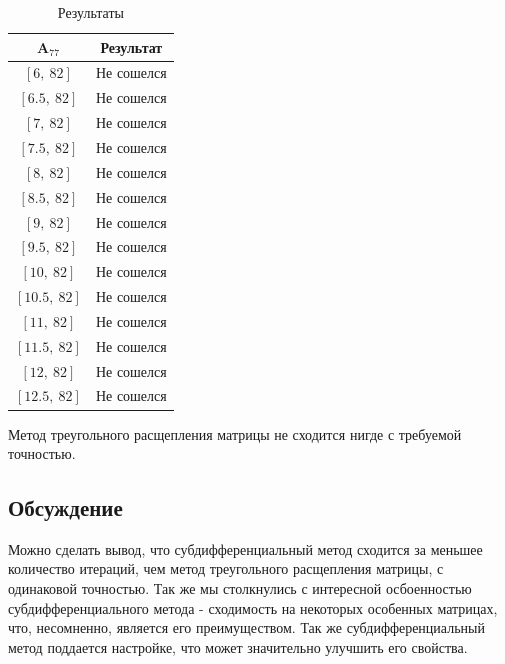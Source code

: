 \documentclass{article}
\begin{document}
    \begin{table}[H]
			\centering
			\begin{tabular}{|c|c|}
				\hline
				$\textbf{A}_{77}$ & Результат\\
				
				\hline
				$[6, \ 82]$ & Не сошелся \\
				
				\hline
				$[6.5, \ 82]$ & Не сошелся \\
				
				\hline
				$[7, \ 82]$ & Не сошелся \\
				
				\hline
				$[7.5, \ 82]$ & Не сошелся \\
				
				\hline
				$[8, \ 82]$ & Не сошелся \\
				
				\hline
				$[8.5, \ 82]$ & Не сошелся \\
				
				\hline
				$[9, \ 82]$ & Не сошелся \\
				
				\hline
				$[9.5, \ 82]$ & Не сошелся \\
				
				\hline
				$[10, \ 82]$ & Не сошелся \\
				
				\hline
				$[10.5, \ 82]$ & Не сошелся \\
				
				\hline
				$[11, \ 82]$ & Не сошелся \\
				
				\hline
				$[11.5, \ 82]$ & Не сошелся \\
				
				\hline
				$[12, \ 82]$ & Не сошелся \\
				
				\hline
				$[12.5, \ 82]$ & Не сошелся \\

				\hline
				
			\end{tabular}
			\caption{Результаты}
		\end{table}
	    
	    Метод треугольного расщепления матрицы не сходится нигде с требуемой точностью.
	    
    \subsection{Обсуждение}
    Можно сделать вывод, что субдифференциальный метод сходится за меньшее количество итераций, чем метод треугольного расщепления матрицы, с одинаковой точностью. Так же мы столкнулись с интересной осбоенностью субдифференциального метода - сходимость на некоторых особенных матрицах, что, несомненно, является его преимуществом. Так же субдифференциальный метод поддается настройке, что может значительно улучшить его свойства.
    
\end{document}
